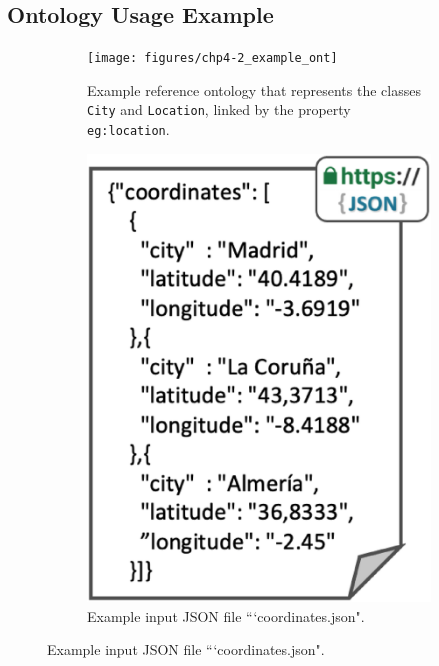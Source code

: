 \subsection{Ontology Usage Example}\label{sec:cm_example} 



\begin{figure}[t!]
    \centering
    \begin{subfigure}[b]{0.45\linewidth}
        \centering
    	\texttt{[image: figures/chp4-2\_example\_ont]}
    	\caption{Example reference ontology that represents the classes \texttt{City} and \texttt{Location}, linked by the property \texttt{eg:location}.}
    	\label{fig:chp4-2_chp4_ex_onto}
    \end{subfigure}
    \begin{subfigure}[b]{0.28\linewidth}
        \centering
    	\includegraphics[width=1\linewidth]{figures/chp4-2_example_json}
    	\caption{Example input JSON file ```coordinates.json".}
    	\label{fig:chp4-2_chp4_ex_json}

\end{subfigure}
\end{figure}
